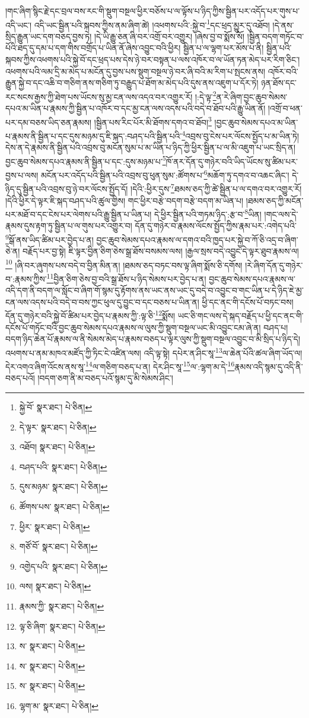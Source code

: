 །གང་ཞིག་སྙིང་རྗེ་དང་བྲལ་བས་རང་གི་སྡུག་བསྔལ་ཕྱིར་བཅོས་པ་ལ་ལྟོས་པ་ཉིད་ཀྱིས་སྦྱིན་པར་འདོད་པར་གུས་པ་འདི་ཡང་། འདི་ཡང་སྦྱིན་པའི་སྐབས་ཀྱིས་ནམ་ཞིག་ཚེ། །འཕགས་པའི་:སྐྱེ་བ་\footnote{སྐྱེ་བོ་  སྣར་ཐང་།  པེ་ཅིན། }དང་ཕྲད་མྱུར་དུ་འཐོབ། །དེ་ནས་སྲིད་རྒྱུན་ཡང་དག་བཅད་བྱས་ཏེ། །དེ་ཡི་རྒྱུ་ཅན་ཞི་བར་འགྲོ་བར་འགྱུར། །ཞེས་བྱ་བ་སྨོས་སོ། །སྦྱིན་བདག་གཏོང་བ་པོའི་ཐད་དུ་དམ་པ་དག་གིས་བགྲོད་པ་ཡིན་ནོ་ཞེས་འབྱུང་བའི་ཕྱིར། སྦྱིན་པ་ལ་ལྷག་པར་མོས་པ་ནི། སྦྱིན་པའི་སྐབས་ཀྱིས་འཕགས་པའི་སྐྱེ་བོ་དང་ཕྲད་པས་དེས་ཉེ་བར་བསྟན་པ་ལས་འཁོར་བ་ལ་ཡོན་ཏན་མེད་པར་རིག་ཅིང་། འཕགས་པའི་ལམ་དྲི་མ་མེད་པ་མངོན་དུ་བྱས་པས་སྡུག་བསྔལ་ཉེ་བར་ཞི་བའི་མ་རིག་པ་སྤངས་ནས། འཁོར་བའི་རྒྱུན་སྐྱེ་བ་དང་འཆི་བ་གཅིག་ནས་གཅིག་ཏུ་བརྒྱུད་པ་ཐོག་མ་མེད་པའི་དུས་ནས་འཇུག་པ་དོར་ཏེ། ཉན་ཐོས་དང་རང་སངས་རྒྱས་ཀྱི་ཐེག་པས་ཡོངས་སུ་མྱ་ངན་ལས་འདའ་བར་འགྱུར་རོ། །:དེ་ལྟ་\footnote{དེ་ལྟར་  སྣར་ཐང་།  པེ་ཅིན། }ན་རེ་ཞིག་བྱང་ཆུབ་སེམས་དཔའ་མ་ཡིན་པ་རྣམས་ཀྱི་སྦྱིན་པ་འཁོར་བ་དང་མྱ་ངན་ལས་འདས་པའི་བདེ་བ་ཐོབ་པའི་རྒྱུ་ཡིན་ནོ། །འགྲོ་བ་ཕན་པར་དམ་བཅས་ཡིད་ཅན་རྣམས། །སྦྱིན་པས་རིང་པོར་མི་ཐོགས་དགའ་བ་ཐོབ།\footnote{འཐོབ།  སྣར་ཐང་།  པེ་ཅིན། } །བྱང་ཆུབ་སེམས་དཔའ་མ་ཡིན་པ་རྣམས་ནི་སྦྱིན་པ་དང་དུས་མཉམ་དུ་ཇི་སྐད་:བཤད་པའི་སྦྱིན་པའི་\footnote{བཤད་པའི་  སྣར་ཐང་།  པེ་ཅིན། }འབྲས་བུ་ངེས་པར་ལོངས་སྤྱོད་པ་མ་ཡིན་ཏེ། དེས་ན་དེ་རྣམས་ནི་སྦྱིན་པའི་འབྲས་བུ་མངོན་སུམ་པ་མ་ཡིན་པ་ཉིད་ཀྱི་ཕྱིར་སྦྱིན་པ་ལ་མི་འཇུག་པ་ཡང་སྲིད་ན། བྱང་ཆུབ་སེམས་དཔའ་རྣམས་ནི་སྦྱིན་པ་དང་:དུས་མཉམ་པ་\footnote{དུས་མཉམ་  སྣར་ཐང་།  པེ་ཅིན། }ཁོ་ནར་དོན་དུ་གཉེར་བའི་ཡིད་ཡོངས་སུ་ཚིམ་པར་བྱས་པ་ལས། མངོན་པར་འདོད་པའི་སྦྱིན་པའི་འབྲས་བུ་ཕུན་སུམ་:ཚོགས་པ་\footnote{ཚོགས་པས་  སྣར་ཐང་།  པེ་ཅིན། }མཆོག་ཏུ་དགའ་བ་འཆང་ཞིང་། དེ་ཉིད་དུ་སྦྱིན་པའི་འབྲས་བུ་ཉེ་བར་ལོངས་སྤྱོད་དོ། །དེའི་:ཕྱིར་དུས་\footnote{ཕྱིར་  སྣར་ཐང་།  པེ་ཅིན། }ཐམས་ཅད་ཀྱི་ཚེ་སྦྱིན་པ་ལ་དགའ་བར་འགྱུར་རོ། །དེའི་ཕྱིར་དེ་ལྟར་ཇི་སྐད་བཤད་པའི་ཚུལ་གྱིས། གང་ཕྱིར་བརྩེ་བདག་བརྩེ་བདག་མ་ཡིན་པ། །ཐམས་ཅད་ཀྱི་མངོན་པར་མཐོ་བ་དང་ངེས་པར་ལེགས་པའི་རྒྱུ་སྦྱིན་པ་ཡིན་པ། དེ་ཕྱིར་སྦྱིན་པའི་གཏམ་ཉིད་:རྩ་བ་\footnote{གཙོ་བོ་  སྣར་ཐང་།  པེ་ཅིན། }ཡིན། །གང་ལས་དེ་རྣམས་དུས་རྟག་ཏུ་སྦྱིན་པ་ལ་གུས་པར་འགྱུར་བ། དོན་དུ་གཉེར་བ་རྣམས་ལོངས་སྤྱོད་ཀྱིས་རྣམ་པར་:འགེད་པའི་\footnote{འགྱེད་པའི་  སྣར་ཐང་།  པེ་ཅིན། }སྒོ་ནས་ཡིད་ཚིམ་པར་བྱེད་པ་ན། བྱང་ཆུབ་སེམས་དཔའ་རྣམས་ལ་དགའ་བའི་ཁྱད་པར་སྐྱེ་བ་ཀོ་ཅི་འདྲ་བ་ཞིག་ཅེ་ན། བརྗོད་པར་བྱ་སྟེ། ཇི་ལྟར་བྱིན་ཅིག་ཅེས་སྒྲ་ཐོས་བསམས་ལས། །རྒྱལ་སྲས་བདེ་འབྱུང་དེ་ལྟར་ཐུབ་རྣམས་ལ།\footnote{ལས།  སྣར་ཐང་།  པེ་ཅིན། } །ཞི་བར་ཞུགས་པས་བདེ་བ་བྱིན་མིན་ན། །ཐམས་ཅད་བཏང་བས་ལྟ་ཞིག་སྨོས་ཅི་དགོས། །རེ་ཞིག་དོན་དུ་གཉེར་བ་:རྣམས་ཀྱིས་\footnote{རྣམས་ཀྱི་  སྣར་ཐང་།  པེ་ཅིན། }བྱིན་ཅིག་ཅེས་བྱ་བའི་སྒྲ་ཐོས་པ་ཉིད་སེམས་པར་བྱེད་པ་ན། བྱང་ཆུབ་སེམས་དཔའ་རྣམས་ལ་འདི་དག་ནི་བདག་ལ་སློང་བ་ཞིག་གོ་སྙམ་དུ་རྟོགས་ནས་ཡང་ནས་ཡང་དུ་བདེ་བ་འབྱུང་བ་གང་ཡིན་པ་དེ་ཉིད་ཇེ་མྱ་ངན་ལས་འདས་པའི་བདེ་བ་བས་ཀྱང་ཕུལ་དུ་བྱུང་བ་དང་བཅས་པ་ཡིན་ན། ཕྱི་དང་ནང་གི་དངོས་པོ་བཏང་བས། དོན་དུ་གཉེར་བའི་སྐྱེ་བོ་ཚིམ་པར་བྱེད་པ་རྣམས་ཀྱི་:ལྟ་ཅི་\footnote{ལྟ་ཅི་ཞིག་  སྣར་ཐང་།  པེ་ཅིན། }སྨོས། ཡང་ཅི་གང་ལས་དེ་སྐད་བརྗོད་པ་ཕྱི་དང་ནང་གི་དངོས་པོ་གཏོང་བའི་བྱང་ཆུབ་སེམས་དཔའ་རྣམས་ལ་ལུས་ཀྱི་སྡུག་བསྔལ་ཡང་མི་འབྱུང་ངམ་ཞེ་ན། བཤད་པ། བདག་ཉིད་ཆེན་པོ་རྣམས་ལ་ནི་སེམས་མེད་པ་རྣམས་བཅད་པ་ལྟར་ལུས་ཀྱི་སྡུག་བསྔལ་འབྱུང་བ་མི་སྲིད་པ་ཉིད་དེ། འཕགས་པ་ནམ་མཁའ་མཛོད་ཀྱི་ཏིང་ངེ་འཛིན་ལས། འདི་ལྟ་སྟེ། དཔེར་ན་ཤིང་སཱ་\footnote{ས་  སྣར་ཐང་།  པེ་ཅིན། }ལ་ཆེན་པོའི་ཚལ་ཞིག་ཡོད་ལ། དེར་འགའ་ཞིག་འོངས་ནས་སཱ་\footnote{ས་  སྣར་ཐང་།  པེ་ཅིན། }ལ་གཅིག་བཅད་པ་ན། དེར་ཤིང་སཱ་\footnote{ས་  སྣར་ཐང་།  པེ་ཅིན། }ལ་:ལྷག་མ་དེ་\footnote{ལྷག་མ་  སྣར་ཐང་།  པེ་ཅིན། }རྣམས་འདི་སྙམ་དུ་འདི་ནི་བཅད་པའོ། །བདག་ཅག་ནི་མ་བཅད་པའོ་སྙམ་དུ་མི་སེམས་ཤིང་། 
